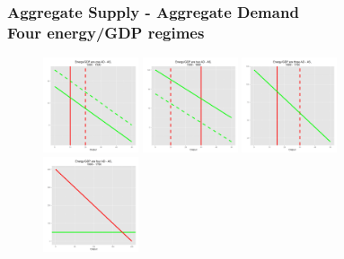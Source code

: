 \documentclass[final]{beamer}
\begin{document}
\begin{frame}
		\frametitle{Aggregate Supply - Aggregate Demand \\ Four energy/GDP regimes}
\begin{figure}[p!]
		\label{fig:asad}		
		\centerline{
		\mbox{\includegraphics[width=0.25\textwidth]{era1}}
		\mbox{\includegraphics[width=0.25\textwidth]{era2}}
		\mbox{\includegraphics[width=0.25\textwidth]{era3}}
		\mbox{\includegraphics[width=0.25\textwidth]{era4}}				
		}
		\end{figure}
\end{frame}
\end{document}
